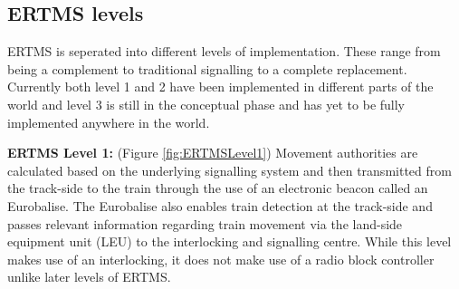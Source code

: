 \label{sec:theertms}
\subsection*{ERTMS levels}
ERTMS is seperated into different levels of implementation. These range from being a complement to traditional signalling to a complete replacement. Currently both level 1 and 2 have been implemented in different parts of the world and level 3 is still in the conceptual phase and has yet to be fully implemented anywhere in the world.

\textbf{ERTMS Level 1:} (Figure \ref{fig:ERTMSLevel1}) Movement authorities are calculated based on the underlying signalling system and then transmitted from the track-side to the train through the use of an electronic beacon called an Eurobalise.  The Eurobalise also enables train detection at the track-side and passes relevant information regarding train movement via the land-side equipment unit (LEU) to the interlocking and signalling centre. While this level makes use of an interlocking,  it does not make use of a radio block controller unlike later levels of ERTMS.  \\

